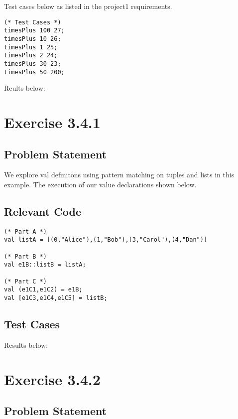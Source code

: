 \documentclass[letterpaper]{report}
\begin{document}
\noindent Test cases below as listed in the project1 requirements.

\begin{lstlisting}
(* Test Cases *)
timesPlus 100 27;
timesPlus 10 26;
timesPlus 1 25;
timesPlus 2 24;
timesPlus 30 23;
timesPlus 50 200;
\end{lstlisting}

\noindent Reults below:


\newpage

\chapter{Exercise 3.4.1}
\label{cha:exercise-3.4.1}

\section{Problem Statement}
We explore val definitons using pattern matching on tuples and lists in 
this example. The execution of our value declarations shown below.

\section{Relevant Code}

\begin{lstlisting}
(* Part A *)
val listA = [(0,"Alice"),(1,"Bob"),(3,"Carol"),(4,"Dan")]

(* Part B *)
val e1B::listB = listA;

(* Part C *)
val (e1C1,e1C2) = e1B;
val [e1C3,e1C4,e1C5] = listB;
\end{lstlisting}

\section{Test Cases}

Results below:


\newpage

\chapter{Exercise 3.4.2}
\label{cha:exercise-3.4.2}

\section{Problem Statement}
\end{document}
